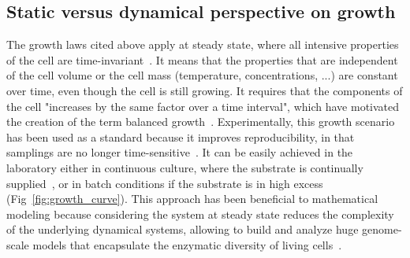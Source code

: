 \subsection{Static versus dynamical perspective on growth}

The growth laws cited above apply at steady state, where all intensive properties of the cell are time-invariant~\cite{schaechter_microbe_2006,fishov_microbial_1995}.
It means that the properties that are independent of the cell volume or the cell mass (temperature, concentrations, ...) are constant over time, even though the cell is still growing.
It requires that the components of the cell "increases by the same factor over a time interval", which have motivated the creation of the term balanced growth~\cite{campbell_synchronization_1957}.
Experimentally, this growth scenario has been used as a standard because it improves reproducibility, in that samplings are no longer time-sensitive~\cite{schaechter_microbe_2006}.
It can be easily achieved in the laboratory either in continuous culture, where the substrate is continually supplied~\cite{borirak_molecular_2014}, or in batch conditions if the substrate is in high excess (Fig~\ref{fig:growth_curve}).
This approach has been beneficial to mathematical modeling because considering the system at steady state reduces the complexity of the underlying dynamical systems, allowing to build and analyze huge genome-scale models that encapsulate the enzymatic diversity of living cells~\cite{orth_what_2010}.

